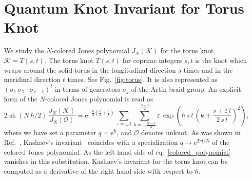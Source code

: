 \documentclass[12pt,reqno]{amsart}
\DeclareMathOperator{\sh}{sh}
\begin{document}
\section{Quantum Knot Invariant for Torus Knot}
\label{sec_invariant}


We study  the $N$-colored Jones polynomial
$J_N(\mathcal{K})$ for the torus knot
$\mathcal{K}=T(s,t)$.
The torus knot $T(s,t)$ for coprime integers $s, t$
is the knot which wraps around the solid torus in the longitudinal
direction $s$ times and in the meridinal direction $t$ times.
See Fig.~\ref{fig:torus}.
It
is also  represented as
$( \sigma_1 \, \sigma_2 \cdots \sigma_{s-1} )^t$ in terms of generators $\sigma_j$ of
the Artin braid group.
An explicit form of the $N$-colored Jones polynomial
is read as~\cite{Mort95a,RossJone93a}
\begin{equation}
  \label{colored_polynomial}
  2 \sh (N \, \hbar /2) \,
  \frac{J_N(\mathcal{K})}{J_N(\mathcal{O})}
  = \mathrm{e}^{- \frac{\hbar}{4} (\frac{t}{s} + \frac{s}{t})} \,
  \sum_{\varepsilon = \pm 1}
  \sum_{k=-\frac{N-1}{2}}^{\frac{N-1}{2}}
  \varepsilon \,
  \exp
  \left(
    \hbar \, s \, t \,
    \left(
      k + \frac{ s + \varepsilon \, t}{2 \, s \, t}
    \right)^2
  \right) ,
\end{equation}
where we have set a parameter $q=\mathrm{e}^\hbar$, and $\mathcal{O}$
denotes unknot.
As was shown in Ref.~,
Kashaev's invariant~\cite{Kasha95,Kasha96b} coincides with
a specialization $q \to \mathrm{e}^{2 \pi \mathrm{i}/N}$ of the colored
Jones polynomial.
As the left hand side of eq.~\eqref{colored_polynomial} vanishes in
this substitution, Kashaev's invariant for the torus knot
can be computed as
a derivative of the right hand side with respect to $\hbar$.
\end{document}

